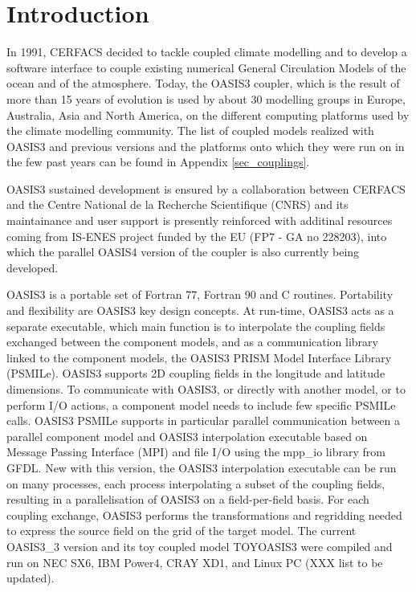 \newpage
\chapter{Introduction}
\label{sec_step}

In 1991, CERFACS decided to tackle coupled climate modelling and to
develop a software interface to couple existing numerical General
Circulation Models of the ocean and of the atmosphere. Today, the
OASIS3 coupler, which is the result of more than 15 years of evolution
is used by about 30 modelling groups in Europe, Australia, Asia and
North America, on the different computing platforms used by the
climate modelling community. The list of
coupled models realized with OASIS3 and previous versions and the
platforms onto which they were run on in the few past years can be
found in Appendix \ref{sec_couplings}.

OASIS3 sustained development is ensured by a collaboration
between CERFACS and the Centre National de la Recherche Scientifique
(CNRS) and its maintainance and user support is presently reinforced
with additinal resources coming from IS-ENES project funded by the EU (FP7 -
GA no 228203), into which the parallel OASIS4 version of the
coupler is also currently being developed. 

OASIS3 is a portable set of Fortran 77, Fortran 90 and C routines.
Portability and flexibility are OASIS3 key design concepts. At
run-time, OASIS3 acts as a separate executable, which main function is
to interpolate the coupling fields exchanged between the component
models, and as a communication library linked to the component models, the OASIS3
PRISM Model Interface Library (PSMILe). OASIS3 supports 2D
coupling fields in the longitude and latitude dimensions. To communicate with OASIS3, or directly with
another model, or to perform I/O actions, a component model needs to
include few specific PSMILe calls. OASIS3 PSMILe supports in
particular parallel communication between a parallel component model
and OASIS3 interpolation executable based on Message Passing Interface
(MPI) and file I/O using the mpp\_io library from GFDL. New with this
version, the OASIS3 interpolation executable can be run on many processes, each process interpolating a
subset of the coupling fields, resulting in a
parallelisation of OASIS3 on a field-per-field basis. For each
coupling exchange, OASIS3 performs the transformations and regridding
needed to express the source field on the grid of the target model.
The current OASIS3\_3 version and its toy coupled model TOYOASIS3 were
compiled and run on NEC SX6, IBM Power4, CRAY XD1, and Linux PC (XXX
list to be updated).

